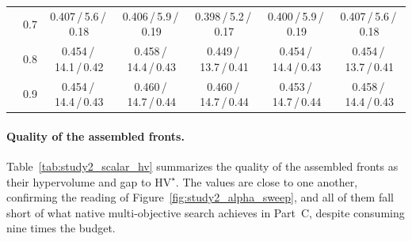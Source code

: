 \begin{table}[!ht]
{\begin{tabular}{clccccc}
         & 0.7 & 0.407\,/\,5.6\,/\,0.18 & 0.406\,/\,5.9\,/\,0.19 & 0.398\,/\,5.2\,/\,0.17 & 0.400\,/\,5.9\,/\,0.19 & 0.407\,/\,5.6\,/\,0.18 \\
         & 0.8 & 0.454\,/\,14.1\,/\,0.42 & 0.458\,/\,14.4\,/\,0.43 & 0.449\,/\,13.7\,/\,0.41 & 0.454\,/\,14.4\,/\,0.43 & 0.454\,/\,13.7\,/\,0.41 \\
         & 0.9 & 0.454\,/\,14.4\,/\,0.43 & 0.460\,/\,14.7\,/\,0.44 & 0.460\,/\,14.7\,/\,0.44 & 0.453\,/\,14.7\,/\,0.44 & 0.458\,/\,14.4\,/\,0.43 \\
        \bottomrule
    \end{tabular}}
\end{table}

\paragraph{Quality of the assembled fronts.}
Table~\ref{tab:study2_scalar_hv} summarizes the quality of the assembled fronts as their hypervolume and gap to $\mathrm{HV}^{\star}$. The values are close to one another, confirming the reading of Figure~\ref{fig:study2_alpha_sweep}, and all of them fall short of what native multi-objective search achieves in Part~C, despite consuming nine times the budget.

